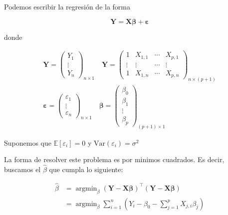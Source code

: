 \documentclass[
  12pt,
]{book}
\theoremstyle{definition}
\theoremstyle{definition}
\theoremstyle{definition}
\theoremstyle{remark}
\begin{document}
Podemos escribir la regresión de la forma

\begin{equation*}
\boldsymbol{Y} = \boldsymbol{X}\boldsymbol{\beta} + \boldsymbol{\varepsilon}
\end{equation*}

donde

\begin{multline*}
\boldsymbol{Y} = 
\begin{pmatrix}
Y_{1} \\
\vdots \\
Y_{n}
\end{pmatrix}_{n\times 1} 
\quad 
\boldsymbol{Y} = 
\begin{pmatrix}
1 & X_{1,1} & \cdots & X_{p,1} \\
\vdots & \vdots & \cdots & \vdots\\
1 & X_{1,n}& \cdots & X_{p,n}
\end{pmatrix}_{n\times (p+1)}
\\
\boldsymbol{\varepsilon} = 
\begin{pmatrix}
\varepsilon_{1} \\
\vdots \\
\varepsilon_{n}
\end{pmatrix}_{n\times 1} 
\quad 
\boldsymbol{\beta} = 
\begin{pmatrix}
\beta_{0} \\
\beta_{1} \\
\vdots \\
\beta_{p}
\end{pmatrix}_{(p+1)\times 1} 
\end{multline*}

Suponemos que \(\mathbb{E}\left[\varepsilon_{i}\right] = 0\) y \(\mathrm{Var}\left(\varepsilon_{i}\right) = \sigma^{2}\)

La forma de resolver este problema es por minimos cuadrados. Es decir, buscamos el \(\hat{\beta}\) que cumpla lo siguiente:

\begin{align}
\hat{\beta} &= 
 \operatorname{argmin}_\beta (\boldsymbol{Y} - \boldsymbol{X} \boldsymbol{\beta})^{\top} (\boldsymbol{Y} - \boldsymbol{X} \boldsymbol{\beta})\\
 &=  \operatorname{argmin}_\beta \sum_{i=1}^n \left( Y_{i} -\beta_{0} - \sum_{j=1}^p X_{j,i} \beta_{j} \right) 
 \label{eq:minimos-cuadrados}
 \end{align}
\end{document}
